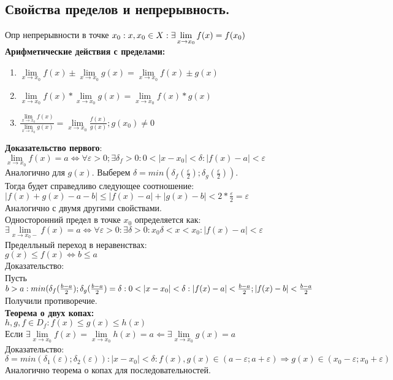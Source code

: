 \documentclass{article}
\begin{document}
\subsection{Свойства пределов и непрерывность.}
Опр непрерывности в точке $x_0:\\
x, x_0 \in X: \exists \lim\limits_{x \to x_0} f(x) = f(x_0)$\\
\textbf{Арифметические действия с пределами:}\\
\begin{enumerate}
\item $\lim\limits_{x \to x_0} f(x) \pm \lim\limits_{x \to x_0} g(x) =\lim\limits_{x \to x_0} f(x) \pm g(x)$
\item $\lim\limits_{x \to x_0} f(x)* \lim\limits_{x \to x_0} g(x) =\lim\limits_{x \to x_0} f(x)*g(x)$
\item $ \frac{\lim\limits_{x \to x_0} f(x)}{\lim\limits_{x \to x_0} g(x)}  =\lim\limits_{x \to x_0} \frac{f(x)}{g(x)}; g(x_0) \neq 0 $
\end{enumerate}
\textbf{Доказательство первого}:\\
$\lim\limits_{x \to x_0} f(x) = a \Leftrightarrow \forall \varepsilon >0; \exists \delta_f >0: 0<|x-x_0|<\delta : |f(x)-a|<\varepsilon $\\
Аналогично для $g(x)$. Выберем $\delta = min(\delta_f (\frac{\varepsilon}{2}) ;\delta_g(\frac{\varepsilon}{2}))$.\\
Тогда будет справедливо следующее соотношение:\\
$|f(x)+g(x)-a-b|\leq |f(x)-a|+|g(x)-b|<2*\frac{\varepsilon}{2}=\varepsilon$\\
Аналогично с двумя другими свойствами.\\
Односторонний предел в точке $x_0$ определяется как:\\ 
$\exists \lim\limits_{x \to x_0-} f(x) = a \Leftrightarrow \forall \varepsilon >0: \exists \delta >0: x_0\delta < x< x_0: |f(x)-a|<\varepsilon$\\
Пределльный переход в неравенствах:\\
$g(x) \leq f(x) \Leftrightarrow b \leq a$\\
Доказательство:\\
Пусть $ b>a: min(\delta_f(\frac{b-a}{2}); \delta_g(\frac{b-a}{2}) = \delta: 0<|x-x_0|<\delta:\\ |f(x)-a|<\frac{b-a}{2}; |f(x)-b|< \frac{b-a}{2}$
Получили противоречие.\\
\textbf{Теорема о двух копах:}\\
$h,g,f \in D_f: f(x) \leq g(x) \leq h(x)$\\
Если  $\exists \lim\limits_{x \to x_0} f(x) = \lim\limits_{x \to x_0} h(x) = a \Leftarrow \exists \lim\limits_{x \to x_0} g(x) = a$\\
Доказательство:\\
$\delta = min(\delta_1(\varepsilon);\delta_2(\varepsilon)): |x-x_0|<\delta: f(x),g(x) \in (a-\varepsilon;a+\varepsilon) \Rightarrow g(x) \in (x_0-\varepsilon; x_0+\varepsilon)$\\
Аналогично теорема о копах для последовательностей.\\
\end{document}
